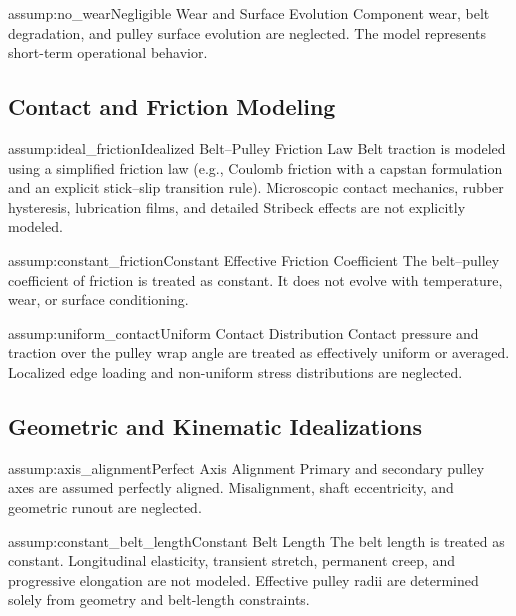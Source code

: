 \documentclass[11pt]{article}
\numberwithin{equation}{section}
\newcounter{assump}
\begin{document}
\begin{assumptionblock}{assump:no_wear}{Negligible Wear and Surface Evolution}
Component wear, belt degradation, and pulley surface evolution
are neglected.
The model represents short-term operational behavior.
\end{assumptionblock}

\subsection{Contact and Friction Modeling}

\begin{assumptionblock}{assump:ideal_friction}{Idealized Belt--Pulley Friction Law}
Belt traction is modeled using a simplified friction law
(e.g., Coulomb friction with a capstan formulation and
an explicit stick--slip transition rule).
Microscopic contact mechanics, rubber hysteresis,
lubrication films, and detailed Stribeck effects
are not explicitly modeled.
\end{assumptionblock}

\begin{assumptionblock}{assump:constant_friction}{Constant Effective Friction Coefficient}
The belt--pulley coefficient of friction is treated as constant.
It does not evolve with temperature, wear, or surface conditioning.
\end{assumptionblock}

\begin{assumptionblock}{assump:uniform_contact}{Uniform Contact Distribution}
Contact pressure and traction over the pulley wrap angle
are treated as effectively uniform or averaged.
Localized edge loading and non-uniform stress distributions are neglected.
\end{assumptionblock}

\subsection{Geometric and Kinematic Idealizations}

\begin{assumptionblock}{assump:axis_alignment}{Perfect Axis Alignment}
Primary and secondary pulley axes are assumed perfectly aligned.
Misalignment, shaft eccentricity, and geometric runout are neglected.
\end{assumptionblock}

\begin{assumptionblock}{assump:constant_belt_length}{Constant Belt Length}
The belt length is treated as constant.
Longitudinal elasticity, transient stretch, permanent creep, and
progressive elongation are not modeled.
Effective pulley radii are determined solely from geometry
and belt-length constraints.
\end{assumptionblock}
\end{document}
